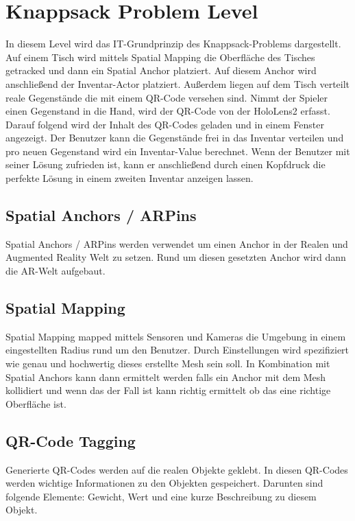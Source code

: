 \section{Knappsack Problem Level}
In diesem Level wird das IT-Grundprinzip des Knappsack-Problems dargestellt.
Auf einem Tisch wird mittels Spatial Mapping die Oberfläche des Tisches
getracked und dann ein Spatial Anchor platziert. Auf diesem Anchor wird
anschließend der Inventar-Actor platziert. Außerdem liegen auf dem Tisch
verteilt reale Gegenstände die mit einem QR-Code versehen sind. Nimmt der
Spieler einen Gegenstand in die Hand, wird der QR-Code von der HoloLens2
erfasst. Darauf folgend wird der Inhalt des QR-Codes geladen und in einem
Fenster angezeigt. Der Benutzer kann die Gegenstände frei in das Inventar
verteilen und pro neuen Gegenstand wird ein Inventar-Value berechnet.
Wenn der Benutzer mit seiner Lösung zufrieden ist, kann er anschließend
durch einen Kopfdruck die perfekte Lösung in einem zweiten Inventar anzeigen
lassen.

\subsection{Spatial Anchors / ARPins}
Spatial Anchors / ARPins werden verwendet um einen Anchor in der Realen und
Augmented Reality Welt zu setzen. Rund um diesen gesetzten Anchor wird dann die
AR-Welt aufgebaut.

\subsection{Spatial Mapping}
Spatial Mapping mapped mittels Sensoren und Kameras die Umgebung in einem
eingestellten Radius rund um den Benutzer. Durch Einstellungen wird spezifiziert
wie genau und hochwertig dieses erstellte Mesh sein soll. In Kombination mit
Spatial Anchors kann dann ermittelt werden falls ein Anchor mit dem Mesh kollidiert
und wenn das der Fall ist kann richtig ermittelt ob das eine richtige Oberfläche ist.

\subsection{QR-Code Tagging}
Generierte QR-Codes werden auf die realen Objekte geklebt. In diesen QR-Codes werden
wichtige Informationen zu den Objekten gespeichert. Darunten sind folgende Elemente:
Gewicht, Wert und eine kurze Beschreibung zu diesem Objekt.


